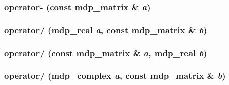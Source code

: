 \label{classmdp__matrix_a60f405280a02350fdc22b1b8b86712c6}
\hypertarget{classmdp__matrix_a6861cfe08a2620bce0a79c2528721884}{
\subsubsection[{operator-\/}]{ operator-\/ (const {\bf mdp\_\-matrix} \& {\em a})}}
\label{classmdp__matrix_a6861cfe08a2620bce0a79c2528721884}
\hypertarget{classmdp__matrix_a78e9bd78d0aa894b75fa5e92e195d327}{
\subsubsection[{operator/}]{ operator/ ({\bf mdp\_\-real} {\em a}, \/  const {\bf mdp\_\-matrix} \& {\em b})}}
\label{classmdp__matrix_a78e9bd78d0aa894b75fa5e92e195d327}
\hypertarget{classmdp__matrix_af30fb437e246a2f03a7b9c22a0e6624a}{
\subsubsection[{operator/}]{ operator/ (const {\bf mdp\_\-matrix} \& {\em a}, \/  {\bf mdp\_\-real} {\em b})}}
\label{classmdp__matrix_af30fb437e246a2f03a7b9c22a0e6624a}
\hypertarget{classmdp__matrix_a5a1dfe012e3c2ab574f2c60f943b36e3}{
\subsubsection[{operator/}]{ operator/ ({\bf mdp\_\-complex} {\em a}, \/  const {\bf mdp\_\-matrix} \& {\em b})}}
